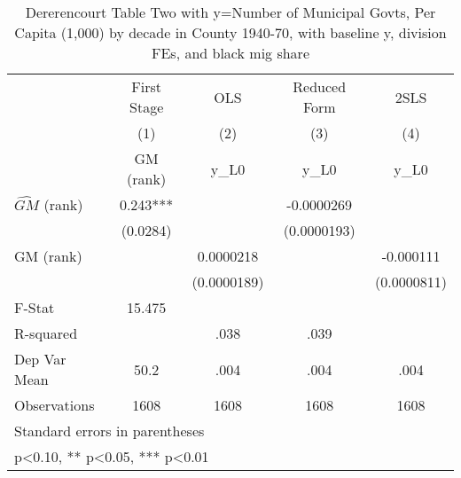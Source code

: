 \begin{table}[htbp]\centering
\def\sym#1{\ifmmode^{#1}\else\(^{#1}\)\fi}
\caption{Dererencourt Table Two with y=Number of Municipal Govts, Per Capita (1,000) by decade in County 1940-70, with baseline y, division FEs, and black mig share}
\begin{tabular}{l*{4}{c}}
\toprule
                    & First Stage   &         OLS   &Reduced Form   &        2SLS   \\
                    &\multicolumn{1}{c}{(1)}&\multicolumn{1}{c}{(2)}&\multicolumn{1}{c}{(3)}&\multicolumn{1}{c}{(4)}\\
                    &\multicolumn{1}{c}{GM  (rank)}&\multicolumn{1}{c}{y\_L0}&\multicolumn{1}{c}{y\_L0}&\multicolumn{1}{c}{y\_L0}\\
\midrule
$\hat{GM}$ (rank)   &       0.243***&               &  -0.0000269   &               \\
                    &    (0.0284)   &               & (0.0000193)   &               \\
\addlinespace
GM  (rank)          &               &   0.0000218   &               &   -0.000111   \\
                    &               & (0.0000189)   &               & (0.0000811)   \\
\midrule
F-Stat              &      15.475   &               &               &               \\
R-squared           &               &        .038   &        .039   &               \\
Dep Var Mean        &        50.2   &        .004   &        .004   &        .004   \\
Observations        &        1608   &        1608   &        1608   &        1608   \\
\bottomrule
\multicolumn{5}{l}{\footnotesize Standard errors in parentheses}\\
\multicolumn{5}{l}{\footnotesize * p<0.10, ** p<0.05, *** p<0.01}\\
\end{tabular}
\end{table}
